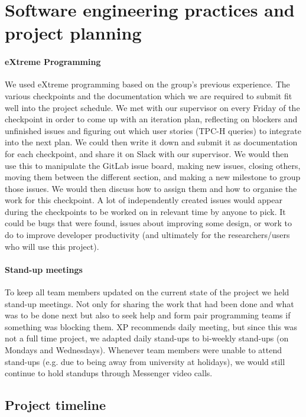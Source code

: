 \newpage
\section{Software engineering practices and project planning}

\paragraph{eXtreme Programming} We used eXtreme programming \cite{XP:2013} based on the group's previous experience. The various checkpoints and the documentation which we are required to submit fit well into the project schedule. We met with our supervisor on every Friday of the checkpoint in order to come up with an iteration plan, reflecting on blockers and unfinished issues and figuring out which user stories (TPC-H queries) to integrate into the next plan. We could then write it down and submit it as documentation for each checkpoint, and share it on Slack with our supervisor. We would then use this to manipulate the GitLab issue board, making new issues, closing others, moving them between the different section, and making a new milestone to group those issues. We would then discuss how to assign them and how to organise the work for this checkpoint. A lot of independently created issues would appear during the checkpoints to be worked on in relevant time by anyone to pick. It could be bugs that were found, issues about improving some design, or work to do to improve developer productivity (and ultimately for the researchers/users who will use this project).

\paragraph{Stand-up meetings} To keep all team members updated on the current state of the project we held stand-up meetings. Not only for sharing the work that had been done and what was to be done next but also to seek help and form pair programming teams if something was blocking them. XP recommends daily meeting, but since this was not a full time project, we adapted daily stand-ups to bi-weekly stand-ups (on Mondays and Wednesdays). Whenever team members were unable to attend stand-ups (e.g. due to being away from university at holidays), we would still continue to hold standups through Messenger video calls.

\subsection{Project timeline}

